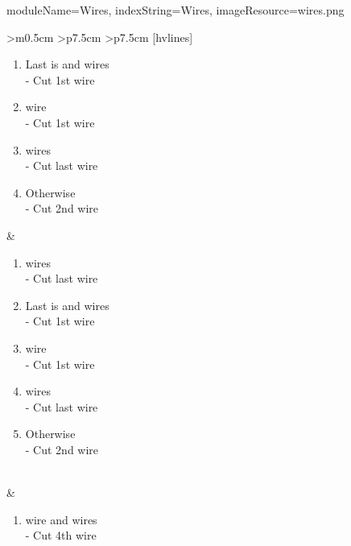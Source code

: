 \documentclass{../../ktane-mod}
\begin{document}
\begin{module}{
  moduleName=Wires,
  indexString=Wires,
  imageResource=wires.png
}
\begin{NiceTabular}{
    >{\centering\arraybackslash}m{0.5cm}
    >{\centering\arraybackslash}p{7.5cm}
    >{\centering\arraybackslash}p{7.5cm}
  }[hvlines]
\begin{minipage}[c][5.1cm][t]{\linewidth}
                                \begin{enumerate}[label=\alph*.,itemsep=0pt]
                                  \item Last is \YELLOW and \RED[no RED] wires\\ - Cut 1st wire
                                  \item \BLUE[1 BLUE] wire\\ - Cut 1st wire
                                  \item \YELLOW[1+ YELLOW] wires\\ - Cut last wire
                                  \item Otherwise\\ - Cut 2nd wire
                                \end{enumerate}
    \end{minipage} & \begin{minipage}[c][5.1cm][t]{\linewidth}
                                                     \vspace*{0.1cm}
                       \begin{enumerate}[label=\alph*.,itemsep=0pt]
                         \item \RED[2+ RED] wires\\ - Cut last \RED wire
                         \item Last is \YELLOW and \RED[no RED] wires\\ - Cut 1st wire
                         \item \BLUE[1 BLUE] wire\\ - Cut 1st wire
                         \item \YELLOW[1+ YELLOW] wires\\ - Cut last wire
                         \item Otherwise\\ - Cut 2nd wire
                       \end{enumerate}
    \end{minipage} \\
     & \begin{minipage}[c][4cm][t]{\linewidth}
                                \vspace*{0.1cm}
                                \begin{enumerate}[label=\alph*.,itemsep=0pt]
                                  \item \RED[1 RED] wire and \YELLOW[2+ YELLOW] wires\\ - Cut 4th wire

\end{enumerate}
\end{minipage}
\end{NiceTabular}
\end{module}
\end{document}
